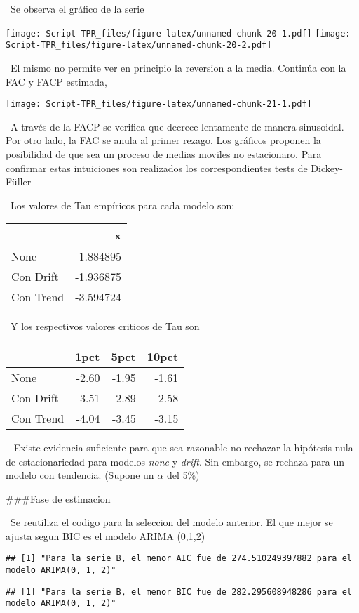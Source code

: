 \documentclass[]{article}
\begin{document}
~Se observa el gráfico de la serie

\texttt{[image: Script-TPR\_files/figure-latex/unnamed-chunk-20-1.pdf]}
\texttt{[image: Script-TPR\_files/figure-latex/unnamed-chunk-20-2.pdf]}

~El mismo no permite ver en principio la reversion a la media. Continúa
con la FAC y FACP estimada,

\texttt{[image: Script-TPR\_files/figure-latex/unnamed-chunk-21-1.pdf]}

~A través de la FACP se verifica que decrece lentamente de manera
sinusoidal. Por otro lado, la FAC se anula al primer rezago. Los
gráficos proponen la posibilidad de que sea un proceso de medias moviles
no estacionaro. Para confirmar estas intuiciones son realizados los
correspondientes tests de Dickey-Füller

~Los valores de Tau empíricos para cada modelo son:

\begin{longtable}[]{@{}lr@{}}
\toprule
& x\tabularnewline
\midrule
\endhead
None & -1.884895\tabularnewline
Con Drift & -1.936875\tabularnewline
Con Trend & -3.594724\tabularnewline
\bottomrule
\end{longtable}

~Y los respectivos valores criticos de Tau son

\begin{longtable}[]{@{}lrrr@{}}
\toprule
& 1pct & 5pct & 10pct\tabularnewline
\midrule
\endhead
None & -2.60 & -1.95 & -1.61\tabularnewline
Con Drift & -3.51 & -2.89 & -2.58\tabularnewline
Con Trend & -4.04 & -3.45 & -3.15\tabularnewline
\bottomrule
\end{longtable}

~ Existe evidencia suficiente para que sea razonable no rechazar la
hipótesis nula de estacionariedad para modelos \emph{none} y
\emph{drift}. Sin embargo, se rechaza para un modelo con tendencia.
(Supone un \(\alpha\) del 5\%)

\#\#\#Fase de estimacion

~Se reutiliza el codigo para la seleccion del modelo anterior. El que
mejor se ajusta segun BIC es el modelo ARIMA (0,1,2)

\begin{verbatim}
## [1] "Para la serie B, el menor AIC fue de 274.510249397882 para el modelo ARIMA(0, 1, 2)"
\end{verbatim}

\begin{verbatim}
## [1] "Para la serie B, el menor BIC fue de 282.295608948286 para el modelo ARIMA(0, 1, 2)"
\end{verbatim}
\end{document}
